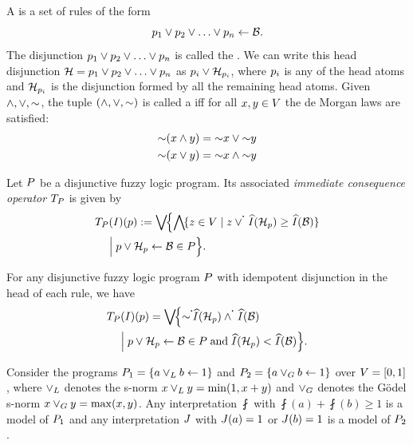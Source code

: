 
A  is a set of rules of the form
\[
    \atom_1 \flpor \atom_2 \flpor \dots\flpor \atom_n \flpif{} \body.
\]
The disjunction $\atom_1 \flpor \atom_2 \flpor \dots\flpor \atom_n$ is called the . We can write this head disjunction $\head=\atom_1 \flpor \atom_2 \flpor \dots\flpor \atom_n$ as $\atom_i \flpor \headminus[\atom_i]$, where $\atom_i$ is any of the head atoms and $\headminus[\atom_i]$ is the disjunction formed by all the remaining head atoms.
Given $\flpand,\flpor,\flpnot$, the tuple $\tuple{\flpand,\flpor,\flpnot}$ is called a  \cite{Klir1995} iff for all $x,y\in\lset$ the de Morgan laws are satisfied:
\begin{align}
    \flpnot (x\flpand y) & =  \flpnot x \flpor \flpnot y  \\
    \flpnot (x\flpor y)  & =  \flpnot x \flpand \flpnot y
\end{align}

\begin{definition}
    \label{def:consequence-operator}
    Let $\flp$ be a disjunctive fuzzy logic program.
    Its associated \emph{immediate consequence operator $\lpop$} is given by
    \begin{align*}
&\lpop(\fint)(\atom) \eqdef \biglub \Bigl\{\bigglb\{z\in\lset \mid z\flpcontf{\flpor}\fformeval{\fint}{\headminus}\geq\fformeval{\fint}{\body}\}\\
&\quad \Bigm| \atom \flpor \headminus\flpif{}\body \in \flp\Bigr\}.
\end{align*}
\end{definition}
\begin{proposition}
    For any disjunctive fuzzy logic program $\flp$ with idempotent disjunction in the head of each rule, we have
    \begin{align*}
&\lpop(\fint)(\atom) = \biglub \Bigl\{\flpnotf\fformeval{\fint}{\head_{\atom}}\flpcontf{\flpand}\fformeval{\fint}{\body}\\
&\quad \Bigm| \atom \flpor \headminus\flpif{}\body \in \flp \tand \fformeval{\fint}{\headminus}<\fformeval{\fint}{\body}\Bigr\}.
\end{align*}
\end{proposition}
\begin{example}
    Consider the programs $\flp_1 = \set{a \flpor_L b \lpif{} \grtst}$ and $\flp_2 = \set{a \flpor_G b \lpif{} \grtst}$ over $\lset=[0,1]$, where $\flpor_L$ denotes the s-norm \mbox{$x \flpor_L y = \min(1,x+y)$} and $\flpor_G$ denotes the Gödel s-norm $x \flpor_G y= \max(x,y)$. Any interpretation $\fint$ with $\fint(a)+\fint(b)\geq 1$ is a model of $\flp_1$ and any interpretation $\fintalt$ with $\fintalt(a)= 1$ or $\fintalt(b)=1$ is a model of $\flp_2$.
\end{example}

